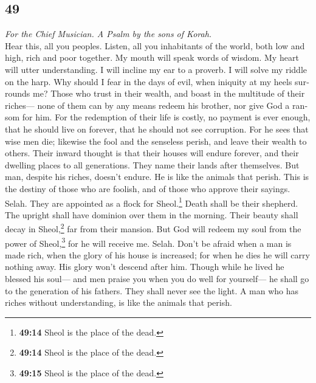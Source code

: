\begin{paracol}{2}
\switchcolumn
\begin{otherlanguage}{english}

\hypertarget{section-97}{%
\section{49}\label{section-97}}

\emph{For the Chief Musician. A Psalm by the sons of Korah.}\\
 Hear this, all you peoples. Listen, all you inhabitants
of the world,  both low and high, rich and poor together.
 My mouth will speak words of wisdom. My heart will utter
understanding.  I will incline my ear to a proverb. I will
solve my riddle on the harp.  Why should I fear in the
days of evil, when iniquity at my heels surrounds me? 
Those who trust in their wealth, and boast in the multitude of their
riches---  none of them can by any means redeem his
brother, nor give God a ransom for him.  For the
redemption of their life is costly, no payment is ever enough,
 that he should live on forever, that he should not see
corruption.  For he sees that wise men die; likewise the
fool and the senseless perish, and leave their wealth to others.
 Their inward thought is that their houses will endure
forever, and their dwelling places to all generations. They name their
lands after themselves.  But man, despite his riches,
doesn't endure. He is like the animals that perish.  This
is the destiny of those who are foolish, and of those who approve their
sayings. Selah.  They are appointed as a flock for
Sheol.\footnote{\textbf{49:14} Sheol is the place of the dead.} Death
shall be their shepherd. The upright shall have dominion over them in
the morning. Their beauty shall decay in Sheol,\footnote{\textbf{49:14}
  Sheol is the place of the dead.} far from their mansion.
 But God will redeem my soul from the power of
Sheol,\footnote{\textbf{49:15} Sheol is the place of the dead.} for he
will receive me. Selah.  Don't be afraid when a man is
made rich, when the glory of his house is increased;  for
when he dies he will carry nothing away. His glory won't descend after
him.  Though while he lived he blessed his soul--- and
men praise you when you do well for yourself---  he shall
go to the generation of his fathers. They shall never see the light.
 A man who has riches without understanding, is like the
animals that perish.


\end{otherlanguage}
\end{paracol}
